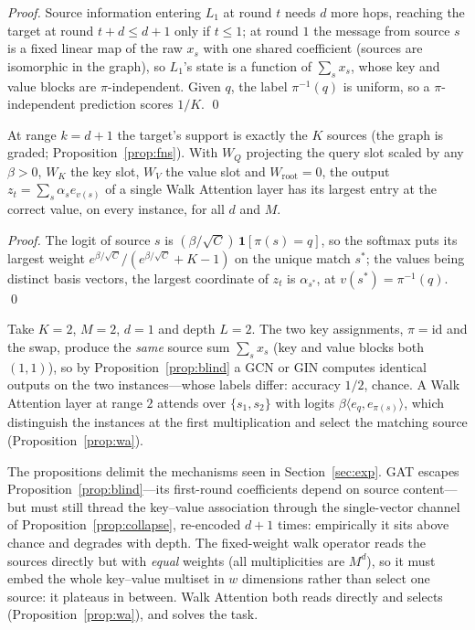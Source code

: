 \documentclass[runningheads]{llncs}
\begin{document}
\begin{proof}
Source information entering $L_1$ at round $t$ needs $d$ more hops, reaching
the target at round $t+d\le d+1$ only if $t\le1$; at round $1$ the message from
source $s$ is a fixed linear map of the raw $x_s$ with one shared coefficient
(sources are isomorphic in the graph), so $L_1$'s state is a function of
$\sum_s x_s$, whose key and value blocks are $\pi$-independent. Given $q$, the
label $\pi^{-1}(q)$ is uniform, so a $\pi$-independent prediction scores $1/K$.
\qed
\end{proof}

\begin{proposition}\label{prop:wa}
At range $k=d+1$ the target's support is exactly the $K$ sources (the graph is
graded; Proposition~\ref{prop:fns}). With $W_Q$ projecting the query slot
scaled by any $\beta>0$, $W_K$ the key slot, $W_V$ the value slot and
$W_{\!\text{root}}=0$, the output $z_t=\sum_s\alpha_s e_{v(s)}$ of a single
Walk Attention layer has its largest entry at the correct value, on every
instance, for all $d$ and $M$.
\end{proposition}

\begin{proof}
The logit of source $s$ is $(\beta/\sqrt{C})\,\mathbf{1}[\pi(s)=q]$, so the
softmax puts its largest weight $e^{\beta/\sqrt{C}}/(e^{\beta/\sqrt{C}}+K-1)$
on the unique match $s^\ast$;
the values being distinct basis vectors, the largest coordinate of $z_t$ is
$\alpha_{s^\ast}$, at $v(s^\ast)=\pi^{-1}(q)$. \qed
\end{proof}

\begin{example}\label{ex:blind}
Take $K=2$, $M=2$, $d=1$ and depth $L=2$. The two key assignments,
$\pi=\mathrm{id}$ and the swap, produce the \emph{same} source sum
$\sum_s x_s$ (key and value blocks both $(1,1)$), so by
Proposition~\ref{prop:blind} a GCN or GIN computes identical outputs on the two
instances---whose labels differ: accuracy $1/2$, chance. A Walk Attention layer
at range $2$ attends over $\{s_1,s_2\}$ with logits
$\beta\langle e_q,e_{\pi(s)}\rangle$, which distinguish the instances at the
first multiplication and select the matching source
(Proposition~\ref{prop:wa}).
\end{example}

\begin{remark}\label{rem:mechanisms}
The propositions delimit the mechanisms seen in Section~\ref{sec:exp}. GAT
escapes Proposition~\ref{prop:blind}---its first-round coefficients depend on
source content---but must still thread the key--value association through the
single-vector channel of Proposition~\ref{prop:collapse}, re-encoded $d+1$
times: empirically it sits above chance and degrades with depth. The
fixed-weight walk operator reads the sources directly but with \emph{equal}
weights (all multiplicities are $M^d$), so it must embed the whole key--value
multiset in $w$ dimensions rather than select one source: it plateaus in
between. Walk Attention both reads directly and selects
(Proposition~\ref{prop:wa}), and solves the task.
\end{remark}
\end{document}
